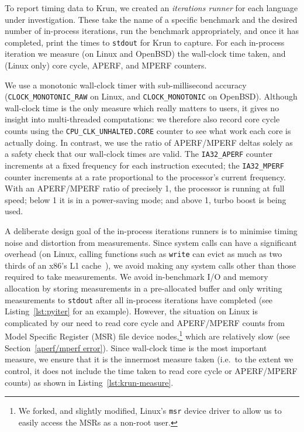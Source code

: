 \documentclass[acmlarge]{acmart}\settopmatter{printfolios=true}
\newcommand{\krun}{Krun\xspace}
\begin{document}
To report timing data to \krun, we created an
\emph{iterations runner} for each language under investigation.
These take the name of a specific benchmark and
the desired number of in-process iterations, run the benchmark appropriately,
and once it has completed, print the times to \texttt{stdout} for \krun to
capture. For each in-process iteration we
measure (on Linux and OpenBSD) the wall-clock time taken, and (Linux only) core
cycle, APERF, and MPERF counters.

We use a monotonic wall-clock timer with sub-millisec\-ond accuracy
(\texttt{CLOCK\_MONOTONIC\_RAW} on Linux, and \texttt{CLOCK\-\_MONOTONIC} on
OpenBSD). Although wall-clock time is the only measure which really matters to
users, it gives no insight into multi-threaded computations: we therefore also record
core cycle counts using the \texttt{CPU\-\_CLK\-\_UNHALTED\-.CORE} counter to see
what work each core is actually doing. In contrast, we use the ratio of APERF/MPERF deltas
solely as a safety check that our wall-clock times are valid.
The \texttt{IA32\_APERF} counter increments at a fixed
frequency for each instruction executed; the \texttt{IA32\_MPERF} counter increments at a rate
proportional to the processor's current frequency. With an APERF/MPERF ratio of
precisely 1, the processor is running at full speed; below 1 it is in
a power-saving mode; and above 1, turbo boost is being used.

A deliberate design goal of the in-process iterations runners is to minimise
timing noise and distortion from measurements. Since system calls can have a
significant overhead (on Linux, calling functions such as \texttt{write} can
evict as much as two thirds of an x86's L1 cache~\cite{soares10flexsc}), we
avoid making any system calls other than those required to take measurements. We
avoid in-benchmark I/O and memory allocation by storing measurements in a
pre-allocated buffer and only writing measurements to \texttt{stdout} after all
in-process iterations have completed (see Listing~\ref{lst:pyiter} for an
example). However, the situation on Linux is complicated by our need to read
core cycle and APERF/MPERF counts from Model Specific Register (MSR) file device
nodes,\footnote{We forked, and slightly modified, Linux's \texttt{msr} device
driver to allow us to easily access the MSRs as a non-root user.} which are relatively
slow (see Section~\ref{aperf/mperf error}). Since wall-clock time
is the most important measure, we ensure that it is the innermost measure taken
(i.e.~to the extent we control, it does not include the time taken to read
core cycle or APERF/MPERF counts) as shown in Listing~\ref{lst:krun-measure}.
\end{document}
